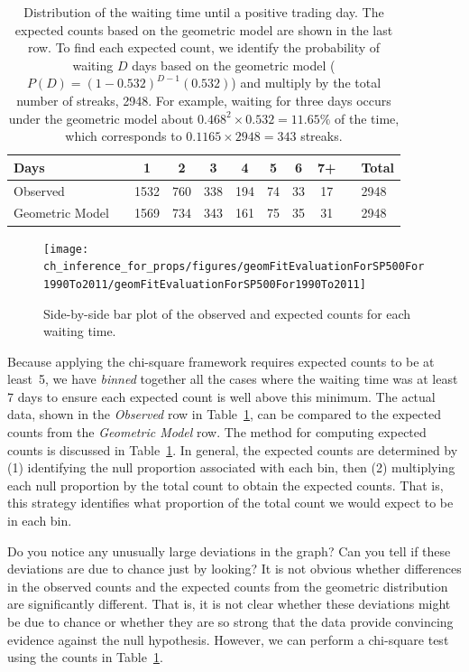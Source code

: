 \begin{table}
\centering
\begin{tabular}{ll ccc ccc c ll}
\hline
Days	 & \hspace{1mm} & 1 & 2 & 3 & 4 & 5 & 6 & 7+ & \hspace{1mm} & Total \\
\hline
Observed &		& 1532 & 760 & 338 & 194 & 74 & 33 & 17 & & 2948 \\
Geometric Model &		& 1569 & 734 & 343 & 161 & 75 & 35 & 31 & & 2948 \\
\hline
\end{tabular}
\caption{Distribution of the waiting time until a positive trading day. The expected counts based on the geometric model are shown in the last row. To find each expected count, we identify the probability of waiting $D$ days based on the geometric model ($P(D) = (1-0.532)^{D-1}(0.532)$) and multiply by the total number of streaks, 2948. For example, waiting for three days occurs under the geometric model about $0.468^2\times 0.532 = 11.65\%$ of the time, which corresponds to $0.1165\times 2948 = 343$ streaks.}
\label{sAndP500For1990To2011TimeToPosTrade2}
\end{table}

\begin{figure}
\centering
\texttt{[image: ch\_inference\_for\_props/figures/geomFitEvaluationForSP500For1990To2011/geomFitEvaluationForSP500For1990To2011]}
\caption{Side-by-side bar plot of the observed and expected counts for each waiting time.}
\label{geomFitEvaluationForSP500For1990To2011}
\end{figure}

Because applying the chi-square framework requires expected counts to be at least~5, we have \emph{binned} together all the cases where the waiting time was at least 7 days to ensure each expected count is well above this minimum. The actual data, shown in the \emph{Observed} row in Table~\ref{sAndP500For1990To2011TimeToPosTrade2}, can be compared to the expected counts from the \emph{Geometric Model} row. The method for computing expected counts is discussed in Table~\ref{sAndP500For1990To2011TimeToPosTrade2}. In general, the expected counts are determined by (1) identifying the null proportion associated with each bin, then (2) multiplying each null proportion by the total count to obtain the expected counts. That is, this strategy identifies what proportion of the total count we would expect to be in each bin.

\begin{example}{Do you notice any unusually large deviations in the graph? Can you tell if these deviations are due to chance just by looking?}
It is not obvious whether differences in the observed counts and the expected counts from the geometric distribution are significantly different. That is, it is not clear whether these deviations might be due to chance or whether they are so strong that the data provide convincing evidence against the null hypothesis. However, we can perform a chi-square test using the counts in Table~\ref{sAndP500For1990To2011TimeToPosTrade2}.
\end{example}

